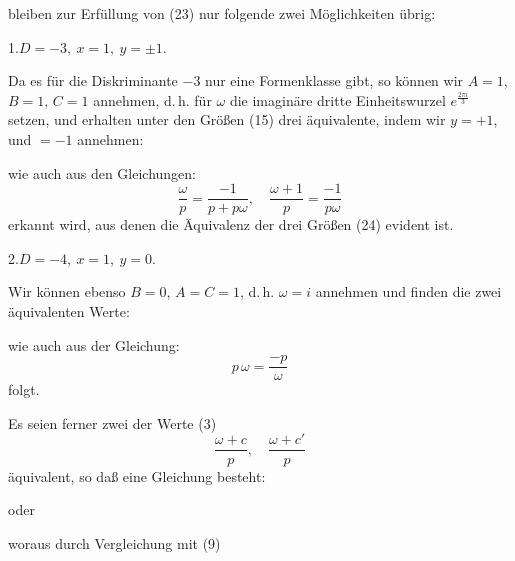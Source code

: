 bleiben zur Erfüllung von (23) nur folgende zwei Möglichkeiten übrig:

1.\quad $D=-3, \ x=1, \ y=\pm 1.$

Da es für die Diskriminante $-3$ nur eine Formenklasse gibt, so können wir $A=1$, $B=1$, $C=1$ annehmen, d.\,h. für $\omega$ die imaginäre dritte Einheitswurzel $e^{\frac{2\pi i}{3}}$ setzen, und erhalten unter den Größen (15) drei äquivalente, indem wir $y=+1$, und $=-1$ annehmen: %


wie auch aus den Gleichungen:
\[
\frac{\omega}{p} = \frac{-1}{p+p\omega}, \quad \frac{\omega+1}{p} = \frac{-1}{p\omega}
\]
erkannt wird, aus denen die Äquivalenz der drei Größen (24) evident ist.

2.\quad $D=-4, \ x=1, \ y=0.$

Wir können ebenso $B=0$, $A=C=1$, d.\,h. $\omega=i$ annehmen und finden die zwei äquivalenten Werte:


wie auch aus der Gleichung:
\[
p\,\omega = \frac{-p}{\omega}
\]
folgt.

Es seien ferner zwei der Werte (3) %
\[
\frac{\omega+c}{p}, \quad \frac{\omega+c'}{p}
\]
äquivalent, so daß eine Gleichung besteht:


oder


woraus durch Vergleichung mit (9)

